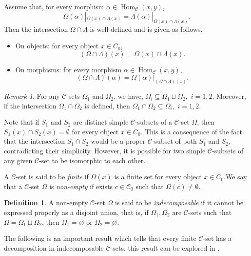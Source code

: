 \documentclass[a4paper]{article}
\theoremstyle{definition}
\newtheorem{defi}[thm]{Definition}
\theoremstyle{remark}
\newtheorem{rem}[thm]{Remark}
\newcommand*{\cat}[1]{\mathcal{#1}}
\newcommand*{\obj}[1]{#1_0}
\newcommand*{\Hom}[3]{\operatorname{Hom}_{\cat{#1}} \left(#2, #3\right)}
\begin{document}
Assume that, for every morphism $\alpha\in\Hom{C}{x}{y}$,
\[
\Omega(\alpha)|_{\Omega(x)\cap\Lambda(x)}
=
\Lambda(\alpha)|_{\Omega(x)\cap\Lambda(x)}.
\]
Then the intersection $\Omega\cap\Lambda$ is well defined and is given as follows.

\begin{itemize}
    \item On objects: for every object $x\in\obj{C}$,
    \[
    (\Omega\cap\Lambda)(x)=\Omega(x)\cap\Lambda(x).
    \]

    \item On morphisms: for every morphism $\alpha\in\Hom{C}{x}{y}$,
    \[
    (\Omega\cap\Lambda)(\alpha)
    =
    \Omega(\alpha)|_{(\Omega\cap\Lambda)(x)}.
    \]
\end{itemize} 

\begin{rem}
   For any $\cat{C}$-sets $\Omega_1$ and $\Omega_2$, we have, 
$ 
\Omega_i \subseteq \Omega_1 \sqcup \Omega_2,
$ $i=1,2.
$ 
Moreover, if the intersection $\Omega_1 \cap \Omega_2$ is defined, then
$ \Omega_1 \cap \Omega_2 \subseteq \Omega_i,
$ $i=1,2.$
\end{rem}


Note that if $S_1$ and $S_2$ are distinct simple $\cat{C}$-subsets of a $\cat{C}$-set $\Omega$, then $S_1(x) \cap S_2(x) = \emptyset$ for every object $x \in \obj{C}$. This is a consequence of the fact that the intersection $S_1 \cap S_2$ would be a proper $\cat{C}$-subset of both $S_1$ and $S_2$, contradicting their simplicity. However, it is possible for two simple $\cat{C}$-subsets of any given $\cat{C}$-set to be isomorphic to each other.

A $\cat{C}$-set is said to be \emph{finite} if $\Omega(x)$ is a finite set for every object $x \in \obj{C}$.We say that a $\cat{C}$-set $\Omega$ is \textit{non-empty} if exists $c \in \obj{\cat{C}}$ such that $\Omega(c) \neq \emptyset$. 
\begin{defi}
	A non-empty $\cat{C}$-set $\Omega$ is said to be \textit{indecomposable} if it cannot be expressed properly as a disjoint union, that is, if $\Omega_1, \Omega_2$ are $\cat{C}$-sets such that $\Omega = \Omega_1 \sqcup \Omega_2$, then $\Omega_1 = \varnothing$ or $\Omega_2 = \varnothing$.
\end{defi}

The following is an important result which tells that every finite $\cat{C}$-set has a decomposition in indecomposable $\cat{C}$-sets, this result can be explored in \cite{Webb23}. 
\end{document}

